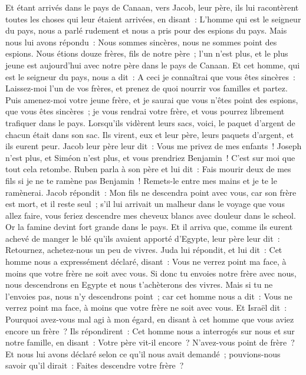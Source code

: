 \begin{multicols}{2}
Et étant arrivés dans le pays de Canaan, vers Jacob, leur père, ils lui racontèrent toutes les choses qui leur étaient arrivées, en disant~:
L'homme qui est le seigneur du pays, nous a parlé rudement et nous a pris pour des espions du pays.
Mais nous lui avons répondu~: Nous sommes sincères, nous ne sommes point des espions.
Nous étions douze frères, fils de notre père~; l'un n'est plus, et le plus jeune est aujourd'hui avec notre père dans le pays de Canaan.
Et cet homme, qui est le seigneur du pays, nous a dit~: A ceci je connaîtrai que vous êtes sincères~: Laissez-moi l'un de vos frères, et prenez de quoi nourrir vos familles et partez.
Puis amenez-moi votre jeune frère, et je saurai que vous n'êtes point des espions, que vous êtes sincères~; je vous rendrai votre frère, et vous pourrez librement trafiquer dans le pays.
Lorsqu'ils vidèrent leurs sacs, voici, le paquet d'argent de chacun était dans son sac. Ils virent, eux et leur père, leurs paquets d'argent, et ils eurent peur.
Jacob leur père leur dit~: Vous me privez de mes enfants~! Joseph n'est plus, et Siméon n'est plus, et vous prendriez Benjamin~! C'est sur moi que tout cela retombe.
Ruben parla à son père et lui dit~: Fais mourir deux de mes fils si je ne te ramène pas Benjamin~! Remets-le entre mes mains et je te le ramènerai.
Jacob répondit~: Mon fils ne descendra point avec vous, car son frère est mort, et il reste seul~; s'il lui arrivait un malheur dans le voyage que vous allez faire, vous feriez descendre mes cheveux blancs avec douleur dans le scheol.
\VerseOne{}Or la famine devint fort grande dans le pays.
Et il arriva que, comme ils eurent achevé de manger le blé qu'ils avaient apporté d'Egypte, leur père leur dit~: Retournez, achetez-nous un peu de vivres.
Juda lui répondit, et lui dit~: Cet homme nous a expressément déclaré, disant~: Vous ne verrez point ma face, à moins que votre frère ne soit avec vous.
Si donc tu envoies notre frère avec nous, nous descendrons en Egypte et nous t'achèterons des vivres.
Mais si tu ne l'envoies pas, nous n'y descendrons point~; car cet homme nous a dit~: Vous ne verrez point ma face, à moins que votre frère ne soit avec vous.
Et Israël dit~: Pourquoi avez-vous mal agi à mon égard, en disant à cet homme que vous aviez encore un frère~?
Ils répondirent~: Cet homme nous a interrogés sur nous et sur notre famille, en disant~: Votre père vit-il encore~? N'avez-vous point de frère~? Et nous lui avons déclaré selon ce qu'il nous avait demandé~; pouvions-nous savoir qu'il dirait~: Faites descendre votre frère~?

\end{multicols}

